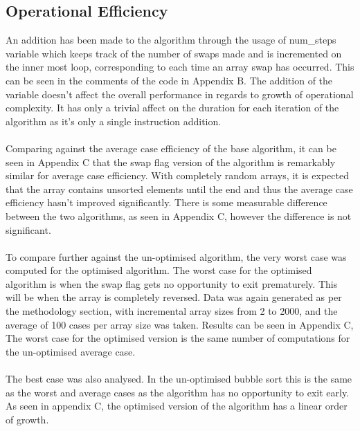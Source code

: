 \documentclass[]{article}
\begin{document}
\subsection{Operational Efficiency}
An addition has been made to the algorithm through the usage of num\_steps variable which keeps track of the number of swaps made and is incremented on the inner most loop, corresponding to each time an array swap has occurred. This can be seen in the comments of the code in Appendix B. The addition of the variable doesn't affect the overall performance in regards to growth of operational complexity. It has only a trivial affect on the duration for each iteration of the algorithm as it's only a single instruction addition.
\\\\
Comparing against the average case efficiency of the base algorithm, it can be seen in Appendix C that the swap flag version of the algorithm is remarkably similar for average case efficiency. With completely random arrays, it is expected that the array contains unsorted elements until the end and thus the average case efficiency hasn't improved significantly. There is some measurable difference between the two algorithms, as seen in Appendix C, however the difference is not significant.  
\\\\
To compare further against the un-optimised algorithm, the very worst case was computed for the optimised algorithm. The worst case for the optimised algorithm is when the swap flag gets no opportunity to exit prematurely. This will be when the array is completely reversed. Data was again generated as per the methodology section, with incremental array sizes from 2 to 2000, and the average of 100 cases per array size was taken. Results can be seen in Appendix C, The worst case for the optimised version is the same number of computations for the un-optimised average case. 
\\\\
The best case was also analysed. In the un-optimised bubble sort this is the same as the worst and average cases as the algorithm has no opportunity to exit early. As seen in appendix C, the optimised version of the algorithm has a linear order of growth. 
\end{document}
